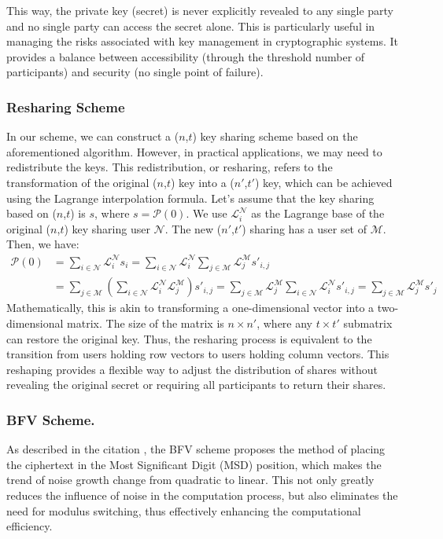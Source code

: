 \documentclass[11pt]{article}
\begin{document}
This way, the private key (secret) is never explicitly revealed to any single party and no single party can access the secret alone.
This is particularly useful in managing the risks associated with key management in cryptographic systems.
It provides a balance between accessibility (through the threshold number of participants) and security (no single point of failure).
\subsubsection{Resharing Scheme}
In our scheme, we can construct a ($n$,$t$) key sharing scheme based on the aforementioned algorithm. However, in practical applications, we may need to redistribute the keys. This redistribution, or resharing, refers to the transformation of the original ($n$,$t$) key into a ($n'$,$t'$) key, which can be achieved using the Lagrange interpolation formula.
Let's assume that the key sharing based on ($n$,$t$) is $s$, where $s=\mathcal{P}(0)$. We use $\mathcal{L}^\mathcal{N}_i$ as the Lagrange base of the original ($n$,$t$) key sharing user $\mathcal{N}$. The new ($n'$,$t'$) sharing has a user set of $\mathcal{M}$. Then, we have:
\begin{equation}
\begin{aligned}
\mathcal{P}(0)&=\sum_{i\in\mathcal{N}}\mathcal{L}^\mathcal{N}_is_i=\sum_{i\in\mathcal{N}}\mathcal{L}^\mathcal{N}_i\sum_{j\in\mathcal{M}}\mathcal{L}^\mathcal{M}_js'_{i,j}\\
&=\sum_{j\in\mathcal{M}}\left(\sum_{i\in\mathcal{N}}\mathcal{L}^\mathcal{N}_i\mathcal{L}^\mathcal{M}_j\right)s'_{i,j}
=\sum_{j\in\mathcal{M}}\mathcal{L}^\mathcal{M}_j\sum_{i\in\mathcal{N}}\mathcal{L}^\mathcal{N}_is'_{i,j}=\sum_{j\in\mathcal{M}}\mathcal{L}^\mathcal{M}_js'_j
\end{aligned}
\end{equation}
Mathematically, this is akin to transforming a one-dimensional vector into a two-dimensional matrix. The size of the matrix is $n \times n'$, where any $t \times t'$ submatrix can restore the original key. Thus, the resharing process is equivalent to the transition from users holding row vectors to users holding column vectors. This reshaping provides a flexible way to adjust the distribution of shares without revealing the original secret or requiring all participants to return their shares.

\subsubsection{BFV Scheme.}
As described in the citation \cite{10.1007/978-3-642-32009-5_50, cryptoeprint:2012/144}, the BFV scheme proposes the method of placing the ciphertext in the Most Significant Digit (MSD) position, which makes the trend of noise growth change from quadratic to linear. This not only greatly reduces the influence of noise in the computation process, but also eliminates the need for modulus switching, thus effectively enhancing the computational efficiency.
\end{document}
